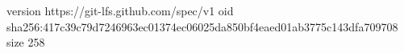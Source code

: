 version https://git-lfs.github.com/spec/v1
oid sha256:417c39c79d7246963ec01374ec06025da850bf4eaed01ab3775c143dfa709708
size 258
